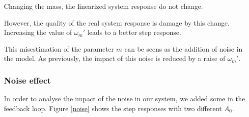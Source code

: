 Changing the mass, the linearized system response do not change.

However, the quality of the real system response is damage by this change. Increasing the value of $\omega_m'$ leads to a better step response.

This misestimation of the parameter $m$ can be seens as the addition of noise in the model. As previously, the impact of this noise is reduced by a raise of $\omega_m'$.

\subsubsection*{Noise effect}

In order to analyse the impact of the noise in our system, we added some in the feedback loop. Figure \ref{noise} shows the step responses with two different $A_0$.


